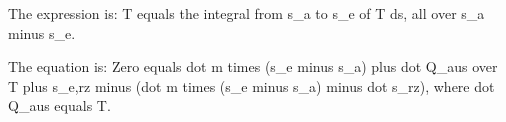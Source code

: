 The expression is:
T equals the integral from s_a to s_e of T ds, all over s_a minus s_e.

The equation is:
Zero equals dot m times (s_e minus s_a) plus dot Q_aus over T plus s_e,rz minus (dot m times (s_e minus s_a) minus dot s_rz), where dot Q_aus equals T.